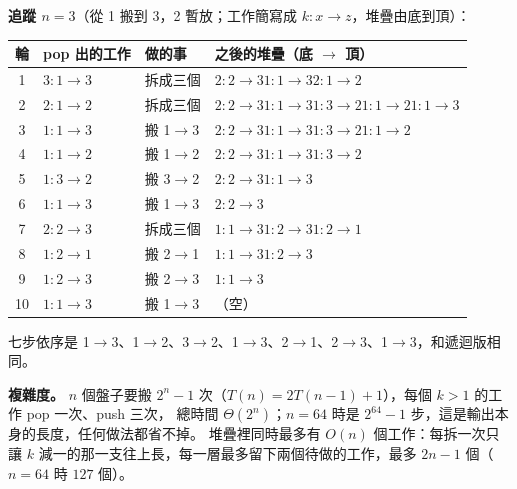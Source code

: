 \begin{pastsoln}
\textbf{追蹤 $n = 3$}（從 1 搬到 3，2 暫放；工作簡寫成 $k{:}x{\to}z$，堆疊由底到頂）：
\begin{center}
\small
\begin{tabular}{clll}
\toprule
輪 & pop 出的工作 & 做的事 & 之後的堆疊（底 $\to$ 頂）\\
\midrule
1 & $3{:}1{\to}3$ & 拆成三個 & $2{:}2{\to}3$\quad $1{:}1{\to}3$\quad $2{:}1{\to}2$ \\
2 & $2{:}1{\to}2$ & 拆成三個 & $2{:}2{\to}3$\quad $1{:}1{\to}3$\quad $1{:}3{\to}2$\quad $1{:}1{\to}2$\quad $1{:}1{\to}3$ \\
3 & $1{:}1{\to}3$ & 搬 1$\to$3 & $2{:}2{\to}3$\quad $1{:}1{\to}3$\quad $1{:}3{\to}2$\quad $1{:}1{\to}2$ \\
4 & $1{:}1{\to}2$ & 搬 1$\to$2 & $2{:}2{\to}3$\quad $1{:}1{\to}3$\quad $1{:}3{\to}2$ \\
5 & $1{:}3{\to}2$ & 搬 3$\to$2 & $2{:}2{\to}3$\quad $1{:}1{\to}3$ \\
6 & $1{:}1{\to}3$ & 搬 1$\to$3 & $2{:}2{\to}3$ \\
7 & $2{:}2{\to}3$ & 拆成三個 & $1{:}1{\to}3$\quad $1{:}2{\to}3$\quad $1{:}2{\to}1$ \\
8 & $1{:}2{\to}1$ & 搬 2$\to$1 & $1{:}1{\to}3$\quad $1{:}2{\to}3$ \\
9 & $1{:}2{\to}3$ & 搬 2$\to$3 & $1{:}1{\to}3$ \\
10 & $1{:}1{\to}3$ & 搬 1$\to$3 & （空）\\
\bottomrule
\end{tabular}
\end{center}
七步依序是 1$\to$3、1$\to$2、3$\to$2、1$\to$3、2$\to$1、2$\to$3、1$\to$3，和遞迴版相同。

\textbf{複雜度。} $n$ 個盤子要搬 $2^n - 1$ 次（$T(n) = 2T(n-1) + 1$），每個 $k > 1$ 的工作 pop 一次、push 三次，
總時間 $\Theta(2^n)$；$n = 64$ 時是 $2^{64} - 1$ 步，這是輸出本身的長度，任何做法都省不掉。 堆疊裡同時最多有
$O(n)$ 個工作：每拆一次只讓 $k$ 減一的那一支往上長，每一層最多留下兩個待做的工作，最多 $2n - 1$ 個（$n = 64$ 時 $127$ 個）。
\end{pastsoln}
